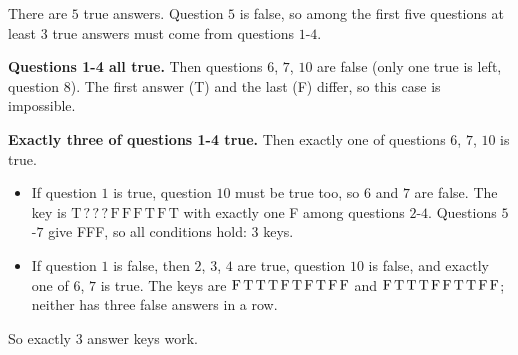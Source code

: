 There are $5$ true answers. Question $5$ is false, so among the first five questions at least $3$ true answers must come from questions $1$-$4$.

\textbf{Questions 1-4 all true.} Then questions $6$, $7$, $10$ are false (only one true is left, question $8$). The first answer (T) and the last (F) differ, so this case is impossible.

\textbf{Exactly three of questions 1-4 true.} Then exactly one of questions $6$, $7$, $10$ is true.
\begin{itemize}
\item If question $1$ is true, question $10$ must be true too, so $6$ and $7$ are false. The key is $\text{T}\,?\,?\,?\,\text{F}\,\text{F}\,\text{F}\,\text{T}\,\text{F}\,\text{T}$ with exactly one F among questions $2$-$4$. Questions $5$-$7$ give FFF, so all conditions hold: $3$ keys.
\item If question $1$ is false, then $2$, $3$, $4$ are true, question $10$ is false, and exactly one of $6$, $7$ is true. The keys are $\text{F\,T\,T\,T\,F\,T\,F\,T\,F\,F}$ and $\text{F\,T\,T\,T\,F\,F\,T\,T\,F\,F}$; neither has three false answers in a row.
\end{itemize}
So exactly $\boxed{3}$ answer keys work.
